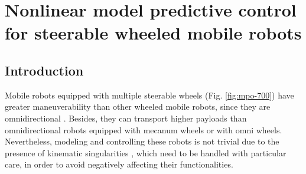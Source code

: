 \chapter{Nonlinear model predictive control for steerable wheeled mobile robots}


\section{Introduction}
Mobile robots equipped with multiple steerable wheels (Fig. \ref{fig:mpo-700}) have greater maneuverability than other wheeled mobile robots, since they are omnidirectional \cite{RobuffoGiordano2009ICRA}. Besides, they can transport higher payloads than omnidirectional robots equipped with mecanum wheels or with omni wheels. Nevertheless, modeling and controlling these robots is not trivial due to the presence of kinematic singularities \cite{Sorour2017RAL}, which need to be handled with particular care, in order to avoid negatively affecting their functionalities.

